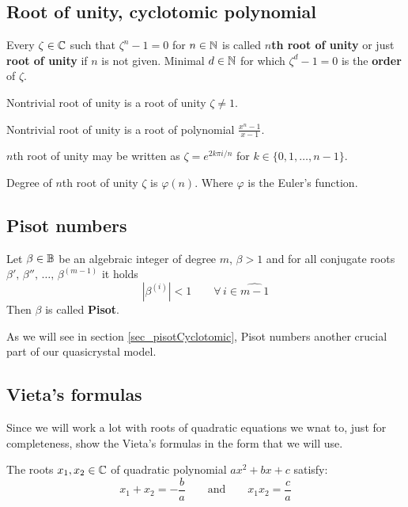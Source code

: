 \documentclass[text.tex]{subfiles}
\begin{document}
\subsection{Root of unity, cyclotomic polynomial}

\begin{definition}
Every $\zeta\in\mathbb{C}$ such that $\zeta^n-1=0$ for $n\in\mathbb{N}$ is called \textbf{$n$th root of unity} or just \textbf{root of unity} if $n$ is not given. Minimal $d\in\mathbb{N}$ for which $\zeta^d-1=0$ is the \textbf{order} of $\zeta$. 

Nontrivial root of unity is a root of unity $\zeta\neq 1$. 
\end{definition}

\begin{remark}
Nontrivial root of unity is a root of polynomial $\frac{x^n-1}{x-1}$.
\end{remark}

\begin{remark}
$n$th root of unity may be written as $\zeta = e^{2k\pi i/n}$ for $k\in \{0, 1, \dots, n-1\}$.
\end{remark}

\begin{theorem}
Degree of $n$th root of unity $\zeta$ is $\varphi(n)$. Where $\varphi$ is the Euler's function.
\end{theorem}

\subsection{Pisot numbers}
\begin{definition}
Let $\beta\in\mathbb{B}$ be an algebraic integer of degree $m$, $\beta>1$  and for all conjugate roots $\beta',\,\beta'',\,\dots ,\,\beta^{(m-1)}$ it holds
$$|\beta^{(i)}|<1\qquad \forall\, i\in\widehat{m-1}$$
Then $\beta$ is called \textbf{Pisot}.
\end{definition}

As we will see in section \ref{sec_pisotCyclotomic}, Pisot numbers another crucial part of our quasicrystal model. 

\subsection{Vieta's formulas}
Since we will work a lot with roots of quadratic equations we wnat to, just for completeness, show the Vieta's formulas in the form that we will use. 

The roots $x_1,x_2\in\mathbb{C}$ of quadratic polynomial $ax^2+bx+c$ satisfy: 
$$x_1+x_2=-\frac{b}{a}\qquad\text{and}\qquad x_1x_2=\frac{c}{a}$$
\end{document}
